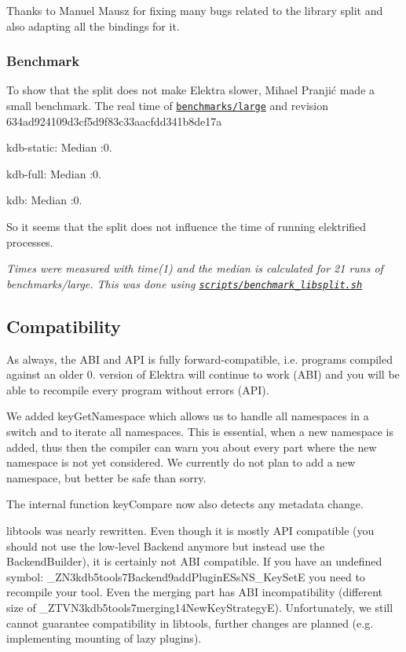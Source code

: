 Thanks to Manuel Mausz for fixing many bugs related to the library split and also adapting all the bindings for it.

\subsubsection*{Benchmark}

To show that the split does not make Elektra slower, Mihael Pranjić made a small benchmark. The real time of \href{https://github.com/ElektraInitiative/libelektra/blob/master/benchmarks/large.c}{\tt benchmarks/large} and revision 634ad924109d3cf5d9f83c33aacfdd341b8de17a


\begin{DoxyEnumerate}
\item kdb-\/static\+: Median \+:0.
\item kdb-\/full\+: Median \+:0.
\item kdb\+: Median \+:0.
\end{DoxyEnumerate}

So it seems that the split does not influence the time of running elektrified processes.

{\itshape Times were measured with time(1) and the median is calculated for 21 runs of benchmarks/large. This was done using \href{https://github.com/ElektraInitiative/libelektra/blob/master/scripts/benchmark_libsplit.sh}{\tt scripts/benchmark\+\_\+libsplit.\+sh}}

\subsection*{Compatibility}

As always, the A\+BI and A\+PI is fully forward-\/compatible, i.\+e. programs compiled against an older 0. version of Elektra will continue to work (A\+BI) and you will be able to recompile every program without errors (A\+PI).

We added {\ttfamily key\+Get\+Namespace} which allows us to handle all namespaces in a switch and to iterate all namespaces. This is essential, when a new namespace is added, thus then the compiler can warn you about every part where the new namespace is not yet considered. We currently do not plan to add a new namespace, but better be safe than sorry.

The internal function {\ttfamily key\+Compare} now also detects any metadata change.

libtools was nearly rewritten. Even though it is mostly A\+PI compatible (you should not use the low-\/level {\ttfamily Backend} anymore but instead use the {\ttfamily Backend\+Builder}), it is certainly not A\+BI compatible. If you have an undefined symbol\+: {\ttfamily \+\_\+\+Z\+N3kdb5tools7\+Backend9add\+Plugin\+E\+Ss\+N\+S\+\_\+Key\+SetE} you need to recompile your tool. Even the merging part has A\+BI incompatibility (different size of {\ttfamily \+\_\+\+Z\+T\+V\+N3kdb5tools7merging14\+New\+Key\+StrategyE}). Unfortunately, we still cannot guarantee compatibility in {\ttfamily libtools}, further changes are planned (e.\+g. implementing mounting of lazy plugins).

